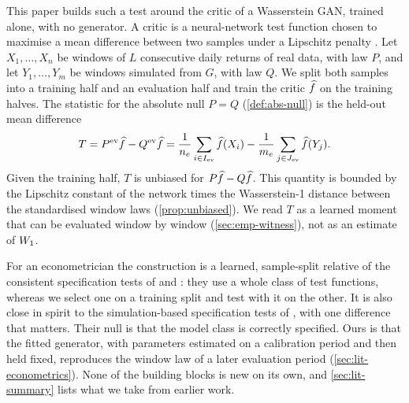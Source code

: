 This paper builds such a test around the critic of a Wasserstein GAN, trained alone, with no
generator. A critic is a neural-network test function chosen to maximise a mean difference
between two samples under a Lipschitz penalty \citep{arjovsky2017wasserstein,gulrajani2017improved}.
Let $X_1,\dots,X_n$ be windows of $L$ consecutive daily returns of real data, with law $P$, and let
$Y_1,\dots,Y_m$ be windows simulated from $G$, with law $Q$. We split both samples into a training
half and an evaluation half and train the critic $\widehat{f}$ on the training halves. The statistic for
the absolute null $P=Q$ (\cref{def:abs-null}) is the held-out mean difference
\begin{equation*}
  T=P^{\mathrm{ev}}\widehat{f}-Q^{\mathrm{ev}}\widehat{f}=\frac{1}{n_e}\sum_{i\in I_{\mathrm{ev}}}\widehat{f}(X_i)-\frac{1}{m_e}\sum_{j\in J_{\mathrm{ev}}}\widehat{f}(Y_j).
\end{equation*}
Given the training half, $T$ is unbiased for $P\widehat{f}-Q\widehat{f}$. This quantity is bounded by the
Lipschitz constant of the network times the Wasserstein-1 distance between the standardised
window laws (\cref{prop:unbiased}). We read $T$ as a learned moment that can be evaluated window
by window (\cref{sec:emp-witness}), not as an estimate of $W_{1}$.

For an econometrician the construction is a learned, sample-split relative of the consistent
specification tests of \citet{bierens1990consistent} and \citet{stinchcombe1998consistent}: they
use a whole class of test functions, whereas we select one on a training split and test with it
on the other. It is also close in spirit to the simulation-based specification tests of
\citet{corradi2005bootstrap}, with one difference that matters. Their null is that the model class
is correctly specified. Ours is that the fitted generator, with parameters estimated on a
calibration period and then held fixed, reproduces the window law of a later evaluation period
(\cref{sec:lit-econometrics}). None of the building blocks is new on its own, and
\cref{sec:lit-summary} lists what we take from earlier work.

